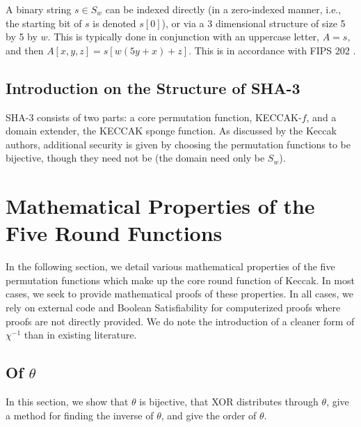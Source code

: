 \documentclass[10pt,twocolumn,twoside]{pnas-new}
\begin{document}
A binary string $s \in S_{w}$ can be indexed directly (in a zero-indexed
manner, i.e., the starting bit of $s$ is denoted $s[0]$), or via a 3
dimensional structure of size 5 by 5 by $w$. This is typically done in
conjunction with an uppercase letter, $A = s$, and then
$A[x, y, z] = s[w(5y + x) + z]$. This is in accordance with
FIPS 202 \cite{NIST202}.

\subsection{Introduction on the Structure of SHA-3} \label{sec:i:structure}

    SHA-3 consists of two parts: a core permutation function, KECCAK-$f$, and
a domain extender, the KECCAK sponge function. As discussed by the Keccak
authors, additional security is given by choosing the permutation functions to
be bijective, though they need not be (the domain need only be $S_{w}$).







\section{Mathematical Properties of the Five Round Functions} \label{sec:properties}

In the following section, we detail various mathematical properties of the five
permutation functions which make up the core round function of Keccak. In most
cases, we seek to provide mathematical proofs of these properties. In all
cases, we rely on external code and Boolean Satisfiability for computerized
proofs where proofs are not directly provided. We do note the introduction of
a cleaner form of $\chi^{-1}$ than in existing literature.


\subsection{Of $\theta$} \label{sec:p:t}


In this section, we show that $\theta$ is bijective, that XOR distributes
through $\theta$, give a method for finding the inverse of $\theta$, and
give the order of $\theta$.
\end{document}
